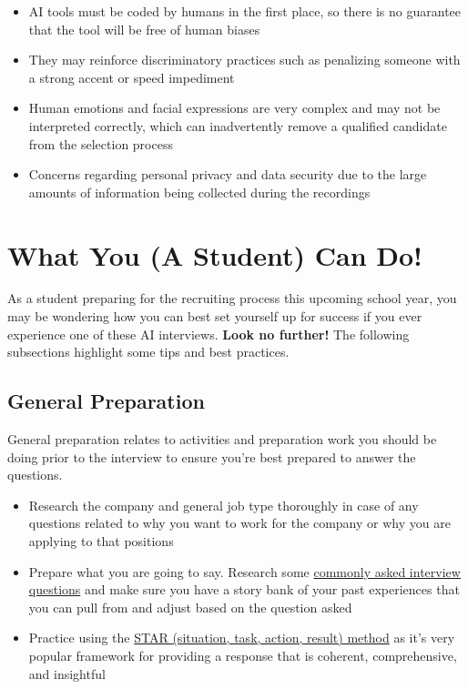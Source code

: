 \documentclass[
]{book}
\begin{document}
\begin{itemize}
\item
  AI tools must be coded by humans in the first place, so there is no guarantee that the tool will be free of human biases
\item
  They may reinforce discriminatory practices such as penalizing someone with a strong accent or speed impediment
\item
  Human emotions and facial expressions are very complex and may not be interpreted correctly, which can inadvertently remove a qualified candidate from the selection process
\item
  Concerns regarding personal privacy and data security due to the large amounts of information being collected during the recordings
\end{itemize}

\hypertarget{what-you-a-student-can-do-2}{%
\section{What You (A Student) Can Do!}\label{what-you-a-student-can-do-2}}

As a student preparing for the recruiting process this upcoming school year, you may be wondering how you can best set yourself up for success if you ever experience one of these AI interviews. \textbf{Look no further!} The following subsections highlight some tips and best practices.

\hypertarget{general-preparation}{%
\subsection{General Preparation}\label{general-preparation}}

General preparation relates to activities and preparation work you should be doing prior to the interview to ensure you're best prepared to answer the questions.

\begin{itemize}
\item
  Research the company and general job type thoroughly in case of any questions related to why you want to work for the company or why you are applying to that positions
\item
  Prepare what you are going to say. Research some \href{https://www.themuse.com/advice/interview-questions-and-answers}{commonly asked interview questions} and make sure you have a story bank of your past experiences that you can pull from and adjust based on the question asked
\item
  Practice using the \href{https://www.themuse.com/advice/star-interview-method}{STAR (situation, task, action, result) method} as it's very popular framework for providing a response that is coherent, comprehensive, and insightful
\end{itemize}
\end{document}
